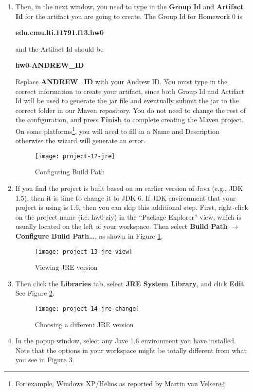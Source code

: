 \begin{enumerate}
\item Then, in the next window, you need to type in the \textbf{Group Id} and
\textbf{Artifact Id} for the artifact you are going to create. The Group Id for
Homework 0 is

\begin{center}
\textbf{edu.cmu.lti.11791.f13.hw0}
\end{center}

and the Artifact Id should be

\begin{center}
\textbf{hw0-ANDREW\_ID}
\end{center}

Replace \textbf{ANDREW\_ID} with your Andrew ID. You must type in the correct
information to create your artifact, since both Group Id and Artifact Id will be
used to generate the jar file and eventually submit the jar to the correct
folder in our Maven repository. You do not need to change the rest of the
configuration, and press \textbf{Finish} to complete creating the Maven project.
On some platforms\footnote{For example, Windows XP/Helios as reported by Martin
van Velsen}, you will need to fill in a Name and Description otherwise the
wizard will generate an error.

\begin{figure}[t]
\centering
\texttt{[image: project-12-jre]}
\caption{Configuring Build Path\label{project-12-jre}}
\end{figure}

\item If you find the project is built based on an earlier version of Java
(e.g., JDK 1.5), then it is time to change it to JDK 6. If JDK environment that
your project is using is 1.6, then you can skip this additional step. First,
right-click on the project name (i.e. hw0-ziy) in the ``Package Explorer'' view,
which is usually located on the left of your workspace. Then select
\textbf{Build Path} $\rightarrow$ \textbf{Configure Build Path\ldots}, as shown
in Figure \ref{project-12-jre}.

\begin{figure}[t]
\centering
\texttt{[image: project-13-jre-view]}
\caption{Viewing JRE version\label{project-13-jre-view}}
\end{figure}

\item Then click the \textbf{Libraries} tab, select \textbf{JRE System Library},
and click \textbf{Edit}. See Figure \ref{project-13-jre-view}.

\begin{figure}[t]
\centering
\texttt{[image: project-14-jre-change]}
\caption{Choosing a different JRE version\label{project-14-jre-change}}
\end{figure}

\item In the popup window, select any Jave 1.6 environment you have installed.
Note that the options in your workspace might be totally different from what you
see in Figure \ref{project-14-jre-change}.

\end{enumerate}

